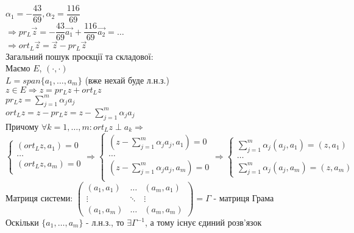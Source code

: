 \documentclass[a4paper, 14pt]{extarticle}
\def\huge{\displaystyle}
\def\bigline{\vspace{5mm}\\}
\begin{document}
$\alpha_1 = -\dfrac{43}{69}, \alpha_2 = \dfrac{116}{69}$\\
$\Rightarrow pr_L \vec{z} = -\dfrac{43}{69} \vec{a_1} + \dfrac{116}{69} \vec{a_2} = \dots$\\
$\Rightarrow ort_L \vec{z} = \vec{z} - pr_L \vec{z}$
\bigline
Загальний пошук проєкції та складової:\\
Маємо $E$, $(\cdot, \cdot)$\\
$L = span\{a_1,\dots,a_m\}$ (вже нехай буде л.н.з.)\\
$z \in E \Rightarrow z = pr_L z + ort_L z$\\
$pr_L z = \huge \sum_{j=1}^m \alpha_j a_j$\\
$ort_L z = z - pr_L z = \huge z - \sum_{j=1}^m \alpha_j a_j$\\
Причому $\forall k = 1,\dots,m: ort_L z \perp a_k \Rightarrow$\\
$\begin{cases}
(ort_L z, a_1) = 0 \\
\dots \\
(ort_L z, a_m) = 0 \\
\end{cases} \Rightarrow
\begin{cases}
(\huge z - \sum_{j=1}^m \alpha_j a_j, a_1) = 0 \\
\dots \\
(\huge z - \sum_{j=1}^m \alpha_j a_j, a_m) = 0 \\
\end{cases} \Rightarrow
\begin{cases}
\huge \sum_{j=1}^m \alpha_j (a_{j}, a_1) = (z,a_1) \\
\dots \\
\huge \sum_{j=1}^m \alpha_j (a_{j}, a_m) = (z,a_m)
\end{cases}
$
Матриця системи: $\begin{pmatrix}
 (a_1,a_1) & \dots & (a_m,a_1) \\
 \vdots & \ddots & \vdots \\
 (a_1,a_m) & \dots & (a_m,a_m)
\end{pmatrix} = \Gamma$ - матриця Грама\\
Оскільки $\{a_1,\dots,a_m\}$ - л.н.з., то $\exists \Gamma^{-1}$, а тому існує єдиний розв'язок
\\
\end{document}
